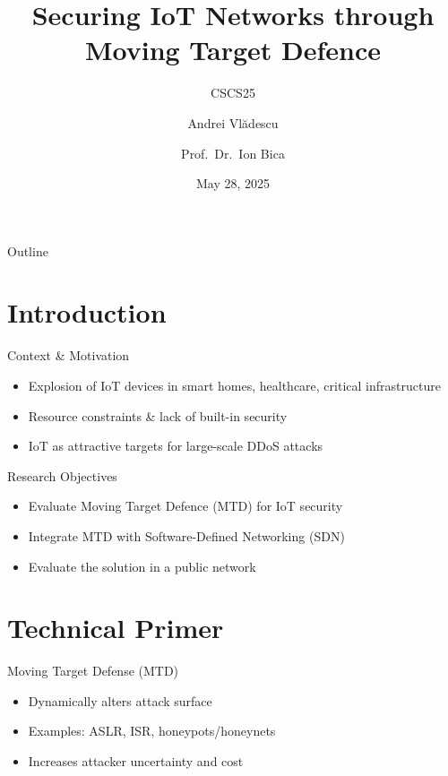 \documentclass{beamer}
\title{Securing IoT Networks through Moving Target Defence}
\subtitle{CSCS25}            %
\date{May 28, 2025}
\author{%
  Andrei Vlădescu\inst{1} \and
  Prof.\ Dr.\ Ion Bica\inst{2}
}
\institute[UNSTV]{%
  \inst{1} University Politehnica of Bucharest (UPB)\\
  \inst{2} “Ferdinand I” Military Technical Academy
}
\begin{document}
\maketitle

\begin{frame}{Outline}
  \tableofcontents
\end{frame}

\section{Introduction}

\begin{frame}{Context \& Motivation}
  \begin{itemize}
    \item Explosion of IoT devices in smart homes, healthcare, critical infrastructure
    \item Resource constraints \& lack of built-in security 
    \item IoT as attractive targets for large-scale DDoS attacks
  \end{itemize}
\end{frame}

\begin{frame}{Research Objectives}
  \begin{itemize}
    \item Evaluate Moving Target Defence (MTD) for IoT security
    \item Integrate MTD with Software-Defined Networking (SDN)
    \item Evaluate the solution in a public network
  \end{itemize}

  \note{}
\end{frame}

\section{Technical Primer}

\begin{frame}{Moving Target Defense (MTD)}
  \begin{itemize}
    \item Dynamically alters attack surface  
    \item Examples: ASLR, ISR, honeypots/honeynets  
    \item Increases attacker uncertainty and cost  
  \end{itemize}
\end{frame}
\end{document}
